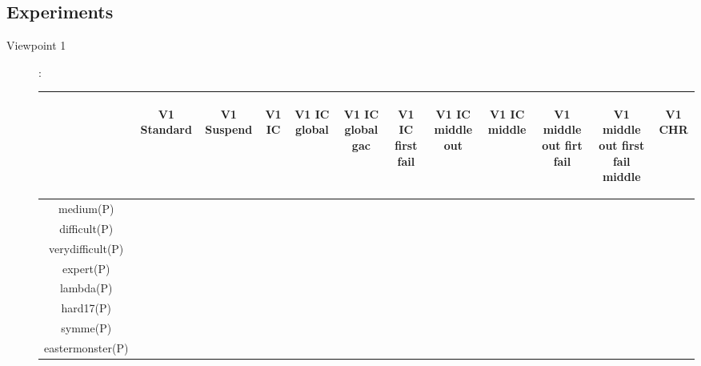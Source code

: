 \subsection{Experiments}\label{exps}
\begin{description}
 \item[Viewpoint 1]:
\begin{center}
\footnotesize
\begin{tabular}{|c|c|c|c|c|c|c|c|c|c|c|c|}
\hline
& \begin{sideways}V1 Standard\end{sideways} & \begin{sideways}V1 Suspend\end{sideways} & \begin{sideways}V1 IC\end{sideways} 
& \begin{sideways}V1 IC global\end{sideways} & \begin{sideways}V1 IC global gac\end{sideways} & \begin{sideways}V1 IC first fail\end{sideways} 
& \begin{sideways}V1 IC middle out\end{sideways} & \begin{sideways}V1 IC middle\end{sideways} & \begin{sideways}V1 middle out firt fail\end{sideways} 
& \begin{sideways}V1 middle out first fail middle\end{sideways} & \begin{sideways}V1 CHR\end{sideways}\\
\hline
\hline                     
medium(P)               & & & & & & & & & & & \\
difficult(P)            & & & & & & & & & & & \\
verydifficult(P)        & & & & & & & & & & & \\
expert(P)               & & & & & & & & & & & \\
lambda(P)               & & & & & & & & & & & \\
hard17(P)               & & & & & & & & & & & \\
symme(P)                & & & & & & & & & & & \\
eastermonster(P)        & & & & & & & & & & & \\

\end{tabular}
\end{center}
\end{description}
